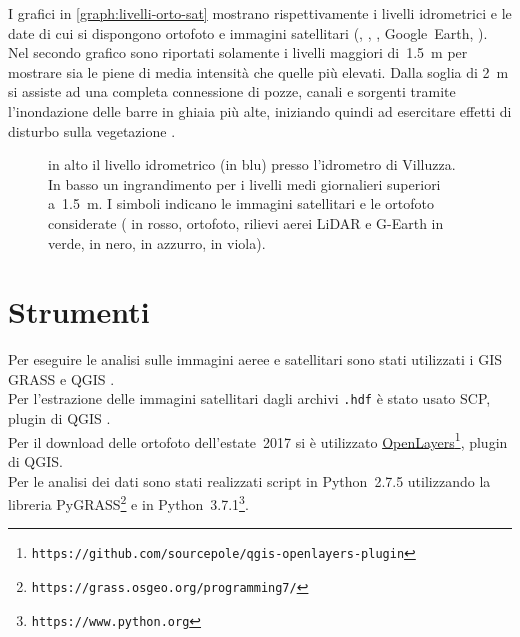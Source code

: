 I grafici in \vref{graph:livelli-orto-sat} mostrano rispettivamente i livelli idrometrici e le date di cui si dispongono ortofoto e immagini satellitari (\AST{}, \Pl{}, \Se{}, Google~Earth, \WV{}). 
Nel secondo grafico sono riportati solamente i livelli maggiori di~\SI{1.5}{\m} per mostrare sia le piene di media intensità che quelle più elevati.
Dalla soglia di \SI{2}{\m} si assiste ad una completa connessione di pozze, canali e sorgenti tramite l'inondazione delle barre in ghiaia più alte, iniziando quindi ad esercitare effetti di disturbo sulla vegetazione .
%
\begin{figure}[p]
	\centering
	
	
	\caption[livelli idrometrici e foto aeree - satellitari]{in alto il livello idrometrico (in blu) presso l'idrometro di Villuzza. 
	In basso un ingrandimento per i livelli medi giornalieri superiori a~\SI{1.5}{\m}. I simboli indicano le immagini satellitari e le ortofoto considerate (\AST{} in rosso, ortofoto, rilievi aerei LiDAR e G-Earth in verde, \Pl{} in nero, \Se{} in azzurro, \WV{} in viola).}
	\label{graph:livelli-orto-sat}
\end{figure}



\section{Strumenti}
Per eseguire le analisi sulle immagini aeree e satellitari sono stati utilizzati i GIS GRASS  e QGIS . 
\\
Per l'estrazione delle immagini satellitari \AST{} dagli archivi \texttt{.hdf} è stato usato SCP, plugin di QGIS . 
\\
Per il download delle ortofoto dell'estate~2017 si è utilizzato \href{https://github.com/sourcepole/qgis-openlayers-plugin}{OpenLayers}\footnote{\texttt{https://github.com/sourcepole/qgis-openlayers-plugin}}, plugin di QGIS.
\\
Per le analisi dei dati sono stati realizzati script in Python~2.7.5 utilizzando la libreria PyGRASS\footnote{\texttt{https://grass.osgeo.org/programming7/}}  e in Python~3.7.1\footnote{\texttt{https://www.python.org}}.
